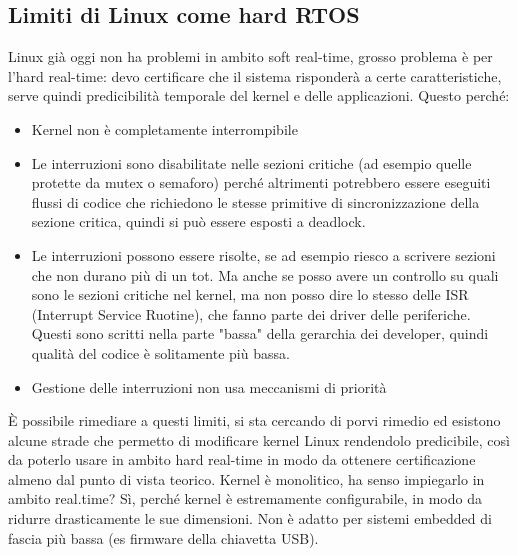 \documentclass{article}
\begin{document}
\subsection{Limiti di Linux come hard RTOS}
Linux già oggi non ha problemi in ambito soft real-time, grosso problema è per l'hard real-time: devo certificare che il sistema risponderà a certe caratteristiche, serve quindi predicibilità temporale del kernel e delle applicazioni. Questo perché:
\begin{itemize}
\item Kernel non è completamente interrompibile
\item Le interruzioni sono disabilitate nelle sezioni critiche (ad esempio quelle protette da mutex o semaforo) perché altrimenti potrebbero essere eseguiti flussi di codice che richiedono le stesse primitive di sincronizzazione della sezione critica, quindi si può essere esposti a deadlock.
\item Le interruzioni possono essere risolte, se ad esempio riesco a scrivere sezioni che non durano più di un tot. Ma anche se posso avere un controllo su quali sono le sezioni critiche nel kernel, ma non posso dire lo stesso delle ISR (Interrupt Service Ruotine), che fanno parte dei driver delle periferiche. Questi sono scritti nella parte "bassa" della gerarchia dei developer, quindi qualità del codice è solitamente più bassa.
\item Gestione delle interruzioni non usa meccanismi di priorità 
\end{itemize}
È possibile rimediare a questi limiti, si sta cercando di porvi rimedio ed esistono alcune strade che permetto di modificare kernel Linux rendendolo predicibile, così da poterlo usare in ambito hard real-time in modo da ottenere certificazione almeno dal punto di vista teorico.
Kernel è monolitico, ha senso impiegarlo in ambito real.time? Sì, perché kernel è estremamente configurabile, in modo da ridurre drasticamente le sue dimensioni. Non è adatto per sistemi embedded di fascia più bassa (es firmware della chiavetta USB).
\end{document}
